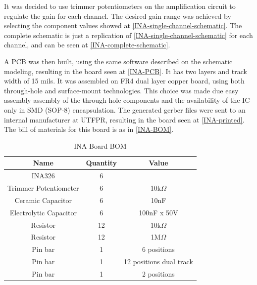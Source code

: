 It was decided to use trimmer potentiometers on the amplification circuit to
regulate the gain for each channel. The desired gain range was achieved by selecting
the component values showed at \autoref{INA-single-channel-schematic}. The complete
schematic is just a replication of \autoref{INA-single-channel-schematic}
for each channel, and can be seen at \autoref{INA-complete-schematic}.

A PCB was then built, using the same software described on the schematic modeling, resulting
in the board seen at \autoref{INA-PCB}. It has two layers and track width of 15 mils.
It was assembled on FR4 dual layer copper board, using both through-hole and
surface-mount technologies. This choice was made due easy assembly assembly
of the through-hole components and the availability of the IC only in SMD (SOP-8)
encapsulation. The generated gerber files were sent to an internal manufacturer
at UTFPR, resulting in the board seen at \autoref{INA-printed}.
The bill of materials for this board is as in \autoref{INA-BOM}.

\begin{table}[htb]
  \begin{center}
    \ABNTEXreducedfont
    \caption[INA Board BOM]{INA Board BOM}
    \label{INA-BOM}
    \begin{tabular}{c|c|c}
      \hline
      Name & Quantity & Value\\
      \hline \hline
      INA326 & 6 & \\
      Trimmer Potentiometer & 6 & 10k$\Omega$ \\
      Ceramic Capacitor & 6 & 10nF \\
      Electrolytic Capacitor & 6 & 100nF x 50V \\
      Resistor & 12 & 10k$\Omega$ \\
      Resistor & 12 & 1M$\Omega$ \\
      Pin bar & 1 & 6 positions  \\
      Pin bar & 1 & 12 positions dual track \\
      Pin bar & 1 & 2 positions \\
      \hline
    \end{tabular}
  \end{center}
\end{table}

